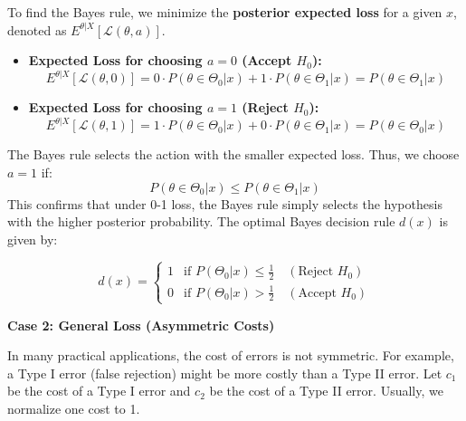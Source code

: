 \documentclass[
  letterpaper,
  DIV=11,
  numbers=noendperiod]{scrreprt}
\renewcommand{\[}{\begin{equation}}
\renewcommand{\]}{\end{equation}}
\theoremstyle{definition}
\theoremstyle{plain}
\theoremstyle{plain}
\theoremstyle{plain}
\theoremstyle{definition}
\theoremstyle{plain}
\theoremstyle{remark}
\begin{document}
To find the Bayes rule, we minimize the \textbf{posterior expected loss}
for a given \(x\), denoted as \(E^{\theta|X}[\mathcal{L}(\theta, a)]\).

\begin{itemize}
\item
  \textbf{Expected Loss for choosing \(a=0\) (Accept \(H_0\)):} \[
    E^{\theta|X}[\mathcal{L}(\theta, 0)] = 0 \cdot P(\theta \in \Theta_0|x) + 1 \cdot P(\theta \in \Theta_1|x) = P(\theta \in \Theta_1|x)
    \]
\item
  \textbf{Expected Loss for choosing \(a=1\) (Reject \(H_0\)):} \[
    E^{\theta|X}[\mathcal{L}(\theta, 1)] = 1 \cdot P(\theta \in \Theta_0|x) + 0 \cdot P(\theta \in \Theta_1|x) = P(\theta \in \Theta_0|x)
    \]
\end{itemize}

The Bayes rule selects the action with the smaller expected loss. Thus,
we choose \(a=1\) if: \[
P(\theta \in \Theta_0|x) \le P(\theta \in \Theta_1|x)
\] This confirms that under 0-1 loss, the Bayes rule simply selects the
hypothesis with the higher posterior probability. The optimal Bayes
decision rule \(d(x)\) is given by:

\[
d(x) = \begin{cases} 
1 & \text{if } P(\Theta_0|x) \le \frac{1}{2} \quad (\text{Reject } H_0) \\ 
0 & \text{if } P(\Theta_0|x) > \frac{1}{2} \quad (\text{Accept } H_0) 
\end{cases}
\]

\textbf{Case 2: General Loss (Asymmetric Costs)}

In many practical applications, the cost of errors is not symmetric. For
example, a Type I error (false rejection) might be more costly than a
Type II error. Let \(c_1\) be the cost of a Type I error and \(c_2\) be
the cost of a Type II error. Usually, we normalize one cost to 1.
\end{document}
